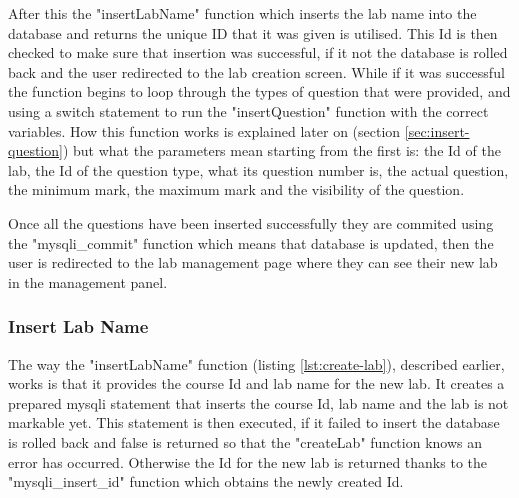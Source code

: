 \documentclass[12pt]{article}  %
\begin{document}
After this the "insertLabName" function which inserts the lab name into the database and returns the unique ID that it was given is utilised. This Id is then checked to make sure that insertion was successful, if it not the database is rolled back and the user redirected to the lab creation screen. While if it was successful the function begins to loop through the types of question that were provided, and using a switch statement to run the "insertQuestion" function with the correct variables. How this function works is explained later on (section \ref{sec:insert-question}) but what the parameters mean starting from the first is: the Id of the lab, the Id of the question type, what its question number is, the actual question, the minimum mark, the maximum mark and the visibility of the question.

Once all the questions have been inserted successfully they are commited using the "mysqli\_commit" function which means that database is updated, then the user is redirected to the lab management page where they can see their new lab in the management panel.


\subsubsection{Insert Lab Name}\label{sec:inset-lab}

The way the "insertLabName" function (listing \ref{lst:create-lab}), described earlier, works is that it provides the course Id and lab name for the new lab. It creates a prepared mysqli statement that inserts the course Id, lab name and the lab is not markable yet. This statement is then executed, if it failed to insert the database is rolled back and false is returned so that the "createLab" function knows an error has occurred. Otherwise the Id for the new lab is returned thanks to the "mysqli\_insert\_id" function which obtains the newly created Id.
\end{document}

